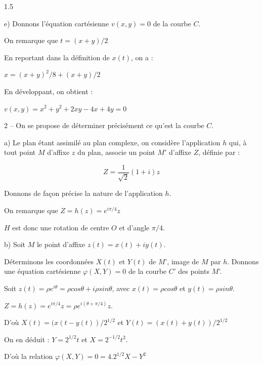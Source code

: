 \documentclass[12pt]{article}
\begin{document}
\begin{spacing}{1.5}





e) Donnons l'équation cartésienne $v(x, y) = 0$ de la courbe $C$. 

On remarque que $t = (x + y)/2$ 

En reportant dans la définition de $x(t)$, on a : 

$x = (x + y)^2/8 + (x + y)/2$ 

En développant, on obtient : 

$v(x, y) = x^2+ y^2 + 2xy-4x + 4y = 0$ 

2 – On se propose de déterminer précisément ce qu'est la courbe $C$. 

a) Le plan étant assimilé au plan complexe, on considère l'application $h$ qui, à tout 
point $M$ d'affixe $z$ du plan, associe un point $M'$ d'affixe $Z$, définie par : 

\[
Z= \frac{1}{\sqrt{2}}(1+i)z\]

 Donnons de façon précise la nature de l'application $h$. 

On remarque que $Z = h(z) = e^{i\pi/4}z$
 
$H$ est donc une rotation de centre $O$ et d'angle $\pi/4$. 

b) Soit $M$ le point d'affixe $z(t) = x(t) + i y(t)$.
 
Déterminons les coordonnées $X(t)$ et $Y(t)$ de $M’$, image de $M$ par $h$. 
Donnons une équation cartésienne $\varphi(X, Y) = 0$ de la courbe $C’$ des points $M$’. 
  
Soit $z(t) = \rho e^{i\theta} = \rho cos\theta + i\rho sin\theta$, avec $x(t) =\rho cos\theta$ et $y(t) =\rho sin\theta$. 

$Z = h(z) = e^{i\pi/4}z = \rho e^{i(\theta+\pi/4)} z$.
 
D'où $X(t) = (x(t - y(t))/2^{1/2}$  et $Y(t) = (x(t) + y(t))/2^{1/2}$ 

On en déduit : $Y = 2^{1/2}t$ et $X = 2^{-1/2} t^2$.

D'où la relation $\varphi(X, Y) = 0 = 4.2^{1/2} X-Y^2$
 

\end{spacing}
\end{document}
